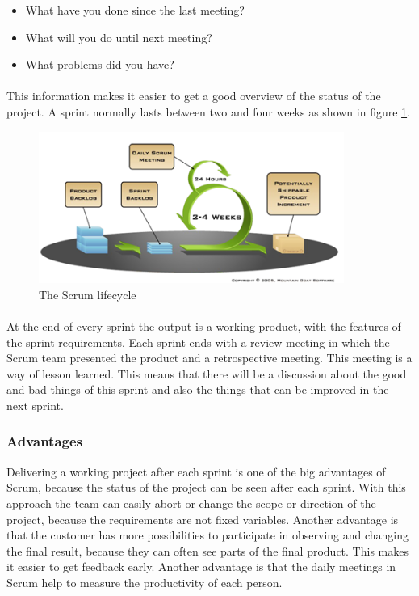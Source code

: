 \begin{itemize}
  \item What have you done since the last meeting?
  \item What will you do until next meeting?
  \item What problems did you have?
\end{itemize}

\paragraph{} This information makes it easier to get a good overview of the status of the project. A sprint normally lasts between two and four weeks as shown in figure \ref{fig:PrelimMethodScrumLife}.

\begin{figure}[ht!]
  \centering
  \includegraphics[width=100mm]{./PreliminaryStudies/img/scrum2.png}
  \caption{The Scrum lifecycle}
  \label{fig:PrelimMethodScrumLife}
\end{figure}

\paragraph{} At the end of every sprint the output is a working product, with the features of the sprint requirements. Each sprint ends with a review meeting in which the Scrum team presented the product and a retrospective meeting. This meeting is a way of lesson learned. This means that there will be a discussion about the good and bad things of this sprint and also the things that can be improved in the next sprint.

\subsubsection{Advantages}
Delivering a working project after each sprint is one of the big advantages of Scrum, because the status of the project can be seen after each sprint. With this approach the team can easily abort or change the scope or direction of the project, because the requirements are not fixed variables. Another advantage is that the customer has more possibilities to participate in observing and changing the final result, because they can often see parts of the final product. This makes it easier to get feedback early. Another advantage is that the daily meetings in Scrum help to measure the productivity of each person.

